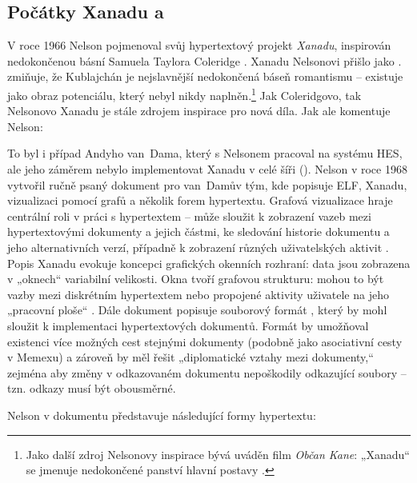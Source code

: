 \subsection{Počátky Xanadu a }

V roce 1966 Nelson pojmenoval svůj hypertextový projekt \emph{Xanadu}, inspirován nedokončenou básní Samuela Taylora Coleridge  \autocite[76]{Barnet2014}. Xanadu Nelsonovi přišlo jako . \Textcite[76]{Barnet2014} zmiňuje, že Kublajchán je nejslavnější nedokončená báseň romantismu -- existuje jako obraz potenciálu, který nebyl nikdy naplněn.\footnote{Jako další zdroj Nelsonovy inspirace bývá uváděn film \emph{Občan Kane}: „Xanadu“ se jmenuje nedokončené panství hlavní postavy \autocite[209]{Glut}.} Jak Coleridgovo, tak Nelsonovo Xanadu je stále zdrojem inspirace pro nová díla. Jak ale komentuje Nelson: 

To byl i případ Andyho van~Dama, který s Nelsonem pracoval na systému HES, ale jeho záměrem nebylo implementovat Xanadu v celé šíři (). Nelson v roce 1968 vytvořil ručně psaný dokument  pro van~Damův tým, kde popisuje ELF, Xanadu, vizualizaci pomocí grafů a několik forem hypertextu. Grafová vizualizace hraje centrální roli v práci s hypertextem -- může sloužit k zobrazení vazeb mezi hypertextovými dokumenty a jejich částmi, ke sledování historie dokumentu a jeho alternativních verzí, případně k zobrazení různých uživatelských aktivit \autocite[4]{hin68}. Popis Xanadu evokuje koncepci grafických okenních rozhraní: data jsou zobrazena v „oknech“ variabilní velikosti. Okna tvoří grafovou strukturu: mohou to být vazby mezi diskrétním hypertextem nebo propojené aktivity uživatele na jeho „pracovní ploše“ \autocite[6--7]{hin68}. Dále dokument popisuje souborový formát , který by mohl sloužit k implementaci hypertextových dokumentů. Formát by umožňoval existenci více možných cest stejnými dokumenty (podobně jako asociativní cesty v Memexu) a zároveň by měl řešit „diplomatické vztahy mezi dokumenty,“ zejména aby změny v odkazovaném dokumentu nepoškodily odkazující soubory \autocite[8--9]{hin68} -- tzn. odkazy musí být obousměrné.

Nelson v dokumentu představuje následující formy hypertextu:

